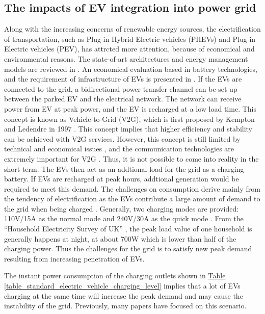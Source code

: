 \documentclass[12pt,a4paper]{report}
\begin{document}
        \subsection{The impacts of EV integration into power grid}
        Along with the increasing concerns of renewable energy sources, the electrification of transportation, such as Plug-in Hybrid Electric vehicles (PHEVs) and Plug-in Electric vehicles (PEV), has attrcted more attention, because of economical and environmental reasons.
        The state-of-art architectures and energy management models are reviewed in \cite{paper:evtechreview}. An economical evaluation based in battery technologies, and the requirement of infrastructure of EVs is presented in \cite{paper:offer_howey_contestabile_clague_brandon_2010}.
        If the EVs are connected to the grid, a bidirectional power transfer channel can be set up between the parked EV and the electrical network. The network can receive power from EV at peak power, and the EV is recharged at a low load time. This concept is known as Vehicle-to-Grid (V2G), which is first proposed by Kempton and Ledendre in 1997 \cite{paper:kempton_letendre_1997}.
        This concept implies that higher efficiency and stability can be achieved with V2G services. However, this concept is still limited by technical and economical issues \cite{paper:evlimitation}, and the communication technologies are extremely important for V2G \cite{website:evcommunicationlimits}. Thus, it is not possible to come into reality in the short term.
        The EVs then act as an addtional load for the grid as a charging battery. If EVs are recharged at peak hours, addtional generation would be required to meet this demand.
        The challenges on consumption derive mainly from the tendency of electrification as the EVs contribute a large amount of demand to the grid when being charged \cite{paper:PieltainFernandez2011}. 
        Generally, two charging modes are provided: 110V/15A as the normal mode and 240V/30A as the quick mode \cite{paper:Shao2010}. 
        From the ``Household Electricity Survey of UK'' \cite{report:household}, the peak load value of one household is generally happens at night, at about 700W which is lower than half of the charging power.
        Thus the challenges for the grid is to satisfy new peak demand resulting from increasing penetration of EVs.

        The instant power consumption of the charging outlets shown in \hyperref[table_standard_electric_vehicle_charging_level]{Table \ref*{table_standard_electric_vehicle_charging_level}} implies that a lot of EVs charging at the same time will increase the peak demand and may cause the instability of the grid. Previously, many papers have focused on this scenario.
\end{document}
